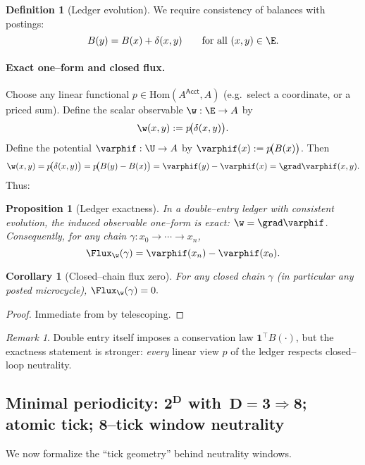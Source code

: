 \documentclass[12pt,a4paper]{article}
\newtheorem{proposition}[theorem]{Proposition}
\newtheorem{corollary}[theorem]{Corollary}
\theoremstyle{definition}
\newtheorem{definition}[theorem]{Definition}
\theoremstyle{remark}
\newtheorem{remark}[theorem]{Remark}
\begin{document}
\begin{definition}[Ledger evolution]
We require consistency of balances with postings:
\[
  B(y)=B(x)+\delta(x,y)\qquad\text{for all }(x,y)\in \E.
\]
\end{definition}

\paragraph{Exact one--form and closed flux.}
Choose any linear functional $p\in\mathrm{Hom}(A^{\mathsf{Acct}},A)$ (e.g.\ select a coordinate, or a priced sum). Define the scalar observable $\w:\E\to A$ by
\[
  \w(x,y):=p\!\big(\delta(x,y)\big).
\]
Define the potential $\varphif:\U\to A$ by $\varphif(x):=p\!\big(B(x)\big)$. Then
\[
  \w(x,y)=p\!\big(\delta(x,y)\big)=p\!\big(B(y)-B(x)\big)=\varphif(y)-\varphif(x)=\grad\varphif(x,y).
\]
Thus:

\begin{proposition}[Ledger exactness]
\label{prop:ledger-exact}
In a double--entry ledger with consistent evolution, the induced observable one--form is exact: $\w=\grad\varphif$. Consequently, for any chain $\gamma:x_0\to\cdots\to x_n$,
\[
  \Flux_{\w}(\gamma)=\varphif(x_n)-\varphif(x_0).
\]
\end{proposition}

\begin{corollary}[Closed--chain flux zero]
\label{cor:closed-flux}
For any closed chain $\gamma$ (in particular any posted microcycle),
\(
  \Flux_{\w}(\gamma)=0.
\)
\end{corollary}

\begin{proof}
Immediate from  by telescoping.
\end{proof}

\begin{remark}
Double entry itself imposes a conservation law $\mathbf{1}^\top B(\cdot)$, but the exactness statement is stronger: \emph{every} linear view $p$ of the ledger respects closed--loop neutrality.
\end{remark}

\subsection{Minimal periodicity: $\boldsymbol{2^D}$ with $\,\boldsymbol{D=3\Rightarrow 8}$; atomic tick; 8--tick window neutrality}
\label{subsec:min-period}

We now formalize the ``tick geometry'' behind neutrality windows.
\end{document}
